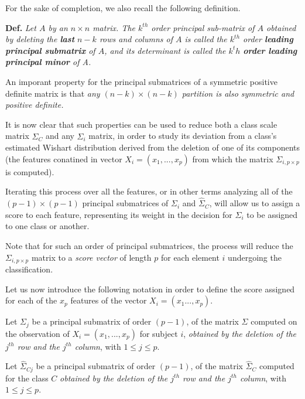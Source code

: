 \documentclass[12pt,openright,twoside,a4paper]{book}
\begin{document}
\vspace{5mm}

For the sake of completion, we also recall the following definition.

\textbf{Def.} \textit{Let $A$ by an $n\times n$ matrix. The $k^{th}$ order principal sub-matrix of $A$ obtained by deleting the \textbf{last} $n-k$ rows and columns of $A$ is called the $k^{th}$ order \textbf{leading principal submatrix} of $A$, and its determinant is called the  $k^{t}h$ \textbf{order leading principal minor} of A.}
\vspace{5mm}

An imporant property for the principal submatrices of a symmetric positive definite matrix is that \textit{any $(n-k)\times (n-k)$ partition is also symmetric and positive definite.}

It is now clear that such properties can be used to reduce both a class scale matrix $\hat{\Sigma}_C$ and any $\Sigma_i$ matrix, in order to study its deviation from a class's estimated Wishart distribution derived from the deletion of one of its components (the features conatined in vector $X_i=(x_1,...,x_p)$ from which the matrix $\Sigma_{i,p\times p}$ is computed).

Iterating this process over all the features, or in other terms analyzing all of the $(p-1)\times (p-1)$ principal submatrices of $\Sigma_i$ and $\hat{\Sigma}_C$, will allow us to assign a score to each feature, representing its weight in the decision for $\Sigma_{i}$ to be assigned to one class or another.

Note that for such an order of principal submatrices, the process will reduce the $\Sigma_{i,p \times p}$ matrix to a \textit{score vector} of length $p$ for each element $i$ undergoing the classification.

Let us now introduce the following notation in order to define the score assigned for each of the $x_p$ features of the vector $X_i=(x_1...,x_p)$.

Let $\Sigma_j$ be a principal submatrix of order $(p-1)$, of the matrix $\Sigma$ computed on the observation of $X_i=(x_1,...,x_p)$ for subject $i$, \textit{obtained by the deletion of the $j^{th}$ row and the $j^{th}$ column}, with $ 1\leq j\leq p$.
\vspace{5mm}

Let  $\hat{\Sigma}_{Cj}$  be a principal submatrix of order $(p-1)$, of the matrix $\hat{\Sigma}_C$ computed for the class $C$ \textit{obtained by the deletion of the $j^{th}$ row and the $j^{th}$ column}, with $ 1\leq j\leq p$.
\vspace{5mm}
\end{document}
